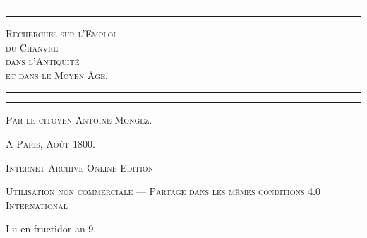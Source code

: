 \documentclass[a4paper, 11pt, oneside, polutonikogreek, french]{article}
\begin{document}
\Fontauri
\begin{titlepage} %
	\centering %

	
	\rule{\textwidth}{1.6pt}\vspace*{-\baselineskip}\vspace*{2pt} %
	\rule{\textwidth}{0.4pt} %
	
	\vspace{1\baselineskip} %
	
	{\scshape\Huge Recherches sur l'Emploi \\ du Chanvre \\ dans l'Antiquité \\ et dans le Moyen Âge,}
	
	\vspace{1\baselineskip} %

	\rule{\textwidth}{0.4pt}\vspace*{-\baselineskip}\vspace{3.2pt} %
	\rule{\textwidth}{1.6pt} %
	
	\vspace{1\baselineskip} %
	

 	\vspace*{1\baselineskip} %

	{\scshape \Large Par le citoyen Antoine Mongez.} %

 	\vspace*{1\baselineskip} %

\vspace*{\fill}

	\vspace{1\baselineskip}

	{\small\scshape A Paris, Août 1800.}
		
	\vspace{0.5\baselineskip} %

\scshape Internet Archive Online Edition%
	
	{\scshape\small Utilisation non commerciale --- Partage dans les mêmes conditions 4.0 International} %
\end{titlepage}
\setlength{\parskip}{1mm plus1mm minus1mm}
\clearpage
\pagestyle{fancy}
\fancyhf{}
\cfoot{\Fontauri{\thepage}}
\Large
\begin{center}
Lu en fructidor an 9.
\end{center}
\end{document}
